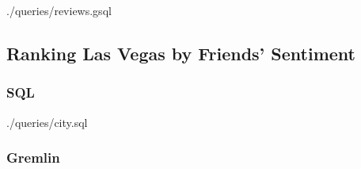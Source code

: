 
{./queries/reviews.gsql}

\subsection{Ranking Las Vegas by Friends' Sentiment}

\subsubsection{SQL}



{./queries/city.sql}

\subsubsection{Gremlin}



